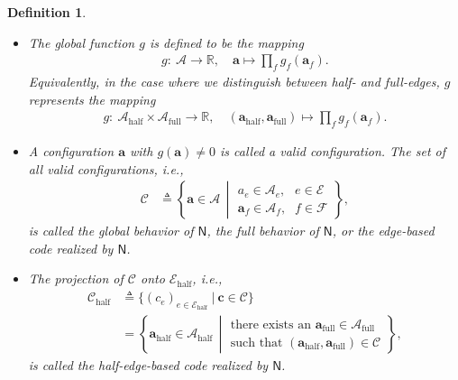 \documentclass[journal, twocolumn]{IEEEtran}
\renewcommand{\mathbf}[1]{{\bm{#1}}}
\newcommand{\ie}{\emph{i.e.}}
\newcommand{\R}{\mathbb{R}}
\newcommand{\vect}[1]{\mathbf{#1}}
\newcommand{\code}[1]{\mathcal{#1}}
\newcommand{\set}[1]{\mathcal{#1}}
\newcommand{\graph}[1]{\mathsf{#1}}
\newcommand{\defeq}{\triangleq}
\newcommand{\codeCedge}{\code{C}}
\newcommand{\codeCedgehalf}{\code{C}_{\mathrm{half}}}
\newcommand{\setA}{\set{A}}
\newcommand{\setAfull}{\set{A}_{\mathrm{full}}}
\newcommand{\setAhalf}{\set{A}_{\mathrm{half}}}
\newcommand{\setE}{\set{E}}
\newcommand{\setEhalf}{\set{E}_{\mathrm{half}}}
\newcommand{\setF}{\set{F}}
\newcommand{\va}{\vect{a}}
\newcommand{\vafull}{\va_{\mathrm{full}}}
\newcommand{\vahalf}{\va_{\mathrm{half}}}
\newcommand{\vc}{\vect{c}}
\newcommand{\graphN}{\graph{N}}
\newcommand{\?}{\mathrm{?}}
\newtheorem{Definition}[Lemma]{Definition}
\begin{document}
\begin{Definition}
\begin{itemize}
  \item The global function $g$ is defined to be the mapping
    \begin{align*}
      g: \
         \setA
           \to \R,
         \quad
         \va
           \mapsto
             \prod_f
               g_f(\va_f).
    \end{align*}
    Equivalently, in the case where we distinguish between half- and
    full-edges, $g$ represents the mapping
    \begin{align*}
      g: \
         \setAhalf \times \setAfull
           \to \R,
         \quad
         (\vahalf, \vafull)
           \mapsto
             \prod_f
               g_f(\va_f).
    \end{align*}

  \item A configuration $\va$ with $g(\va) \neq 0$ is called a valid
    configuration. The set of all valid configurations, \ie,
    \begin{align*}
      \codeCedge
        &\defeq
           \left\{
             \va \in \setA
           \, \middle| \!\!
             \begin{array}{rl}
               \text{$a_e \in \setA_e$,} & \!\!\!\!
               \text{$e \in \setE$} \\
               \text{$\va_f \in \setA_f$,} & \!\!\!\!
               \text{$f \in \setF$}
             \end{array} \!\!
           \right\},
    \end{align*}
    is called the global behavior of $\graphN$, the full behavior of
    $\graphN$, or the edge-based code realized by $\graphN$.

  \item The projection of $\codeCedge$ onto $\setEhalf$, \ie,
    \begin{align*}
      \codeCedgehalf
        &\defeq
           \big\{ 
             (c_e)_{e \in \setEhalf}
           \ \big| \ 
             \vc \in \codeCedge
           \big\} \\
        &= \left\{
             \vahalf \in \setAhalf
           \, \middle| \!\!
             \begin{array}{c}
               \text{there exists an $\vafull \in \setAfull$} \\ 
               \text{such that $(\vahalf,\vafull) \in \codeCedge$}
             \end{array} \!\!
           \right\},
    \end{align*}
    is called the half-edge-based code realized by $\graphN$. 


  \end{itemize}
\end{Definition}
\end{document}
